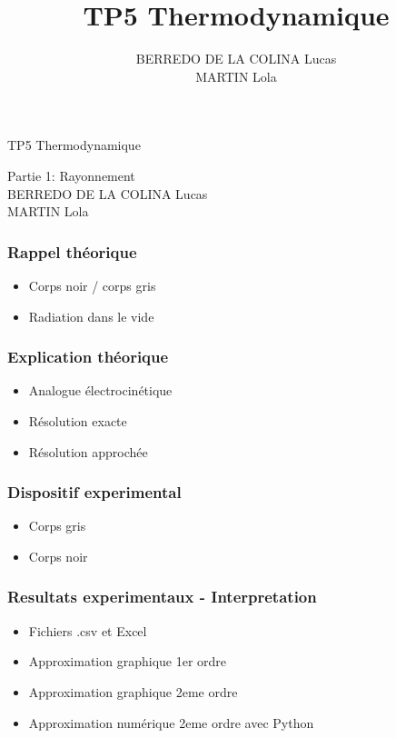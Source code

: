 \documentclass{beamer}
\title{TP5 Thermodynamique}
\author{BERREDO DE LA COLINA Lucas\\ MARTIN Lola}
\date{}
\begin{document}
\begin{frame}

\Huge{TP5 Thermodynamique}

\Large{Partie 1: Rayonnement}
\\[2em]
\large{BERREDO DE LA COLINA Lucas\\ MARTIN Lola}

\end{frame}





\begin{frame}
\frametitle{Rappel théorique}

\begin{itemize}
	\item{Corps noir / corps gris}
	\item{Radiation dans le vide}

\end{itemize}

\end{frame}





\begin{frame}
\frametitle{Explication théorique}

\begin{itemize}
	\item{Analogue électrocinétique}
	\item{Résolution exacte}
	\item{Résolution approchée}
	
\end{itemize}

\end{frame}





\begin{frame}
\frametitle{Dispositif experimental}

\begin{itemize}
	\item{Corps gris}
	\item{Corps noir}

\end{itemize}
\end{frame}





\begin{frame}
\frametitle{Resultats experimentaux - Interpretation}

\begin{itemize}
	\item{Fichiers .csv et Excel}
	\item{Approximation graphique 1er ordre}
	\item{Approximation graphique 2eme ordre}
	\item{Approximation numérique 2eme ordre avec Python}

\end{itemize}
\end{frame}
\end{document}
